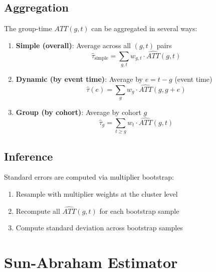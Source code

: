 \subsection{Aggregation}

The group-time $ATT(g, t)$ can be aggregated in several ways:

\begin{definition}
\label{def:cs_aggregation}
\begin{enumerate}
    \item \textbf{Simple (overall)}: Average across all $(g, t)$ pairs
    \begin{equation}
    \hat{\tau}_{\text{simple}} = \sum_{g,t} w_{g,t} \cdot \widehat{ATT}(g, t)
    \end{equation}
    \item \textbf{Dynamic (by event time)}: Average by $e = t - g$ (event time)
    \begin{equation}
    \hat{\tau}(e) = \sum_g w_g \cdot \widehat{ATT}(g, g + e)
    \end{equation}
    \item \textbf{Group (by cohort)}: Average by cohort $g$
    \begin{equation}
    \hat{\tau}_g = \sum_{t \geq g} w_t \cdot \widehat{ATT}(g, t)
    \end{equation}
\end{enumerate}
\end{definition}

\subsection{Inference}

Standard errors are computed via multiplier bootstrap:
\begin{enumerate}
    \item Resample with multiplier weights at the cluster level
    \item Recompute all $\widehat{ATT}(g, t)$ for each bootstrap sample
    \item Compute standard deviation across bootstrap samples
\end{enumerate}

\section{Sun-Abraham Estimator}
\label{sec:sun_abraham}

